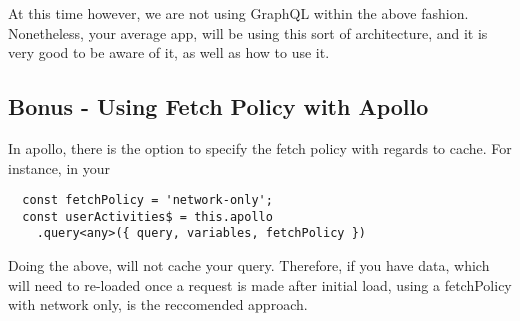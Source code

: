At this time however, we are not using GraphQL within the above fashion.
Nonetheless, your average app, will be using this sort of architecture, and it
is very good to be aware of it, as well as how to use it.

\subsection{ Bonus - Using Fetch Policy with Apollo }
In apollo, there is the option to specify the fetch policy with regards to
cache. For instance, in your

\begin{lstlisting}
  const fetchPolicy = 'network-only';
  const userActivities$ = this.apollo
    .query<any>({ query, variables, fetchPolicy })
\end{lstlisting}

Doing the above, will not cache your query. Therefore, if you have data, which
will need to re-loaded once a request is made after initial load, using a
fetchPolicy with network only, is the reccomended approach.
